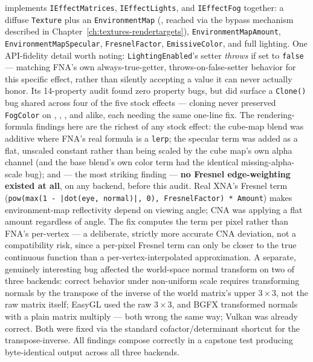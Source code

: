  implements \texttt{IEffectMatrices},
\texttt{IEffectLights}, and \texttt{IEffectFog} together: a diffuse \texttt{Texture} plus an
\texttt{EnvironmentMap} (, reached via the bypass mechanism described in
Chapter~\ref{ch:textures-rendertargets}), \texttt{EnvironmentMapAmount},
\texttt{EnvironmentMapSpecular}, \texttt{FresnelFactor}, \texttt{EmissiveColor}, and full
lighting. One API-fidelity detail worth noting: \texttt{LightingEnabled}'s setter
\emph{throws} if set to \texttt{false} --- matching FNA's own always-true-getter,
throws-on-false-setter behavior for this specific effect, rather than silently accepting a
value it can never actually honor. Its 14-property audit found zero property bugs, but did
surface a \texttt{Clone()} bug shared across four of the five stock effects --- cloning never
preserved \texttt{FogColor} on , ,
, and  alike, each needing the same
one-line fix. The rendering-formula findings here are the richest of any stock effect: the
cube-map blend was additive where FNA's real formula is a \texttt{lerp}; the specular term
was added as a flat, unscaled constant rather than being scaled by the cube map's own alpha
channel (and the base blend's own color term had the identical missing-alpha-scale bug); and
--- the most striking finding --- \textbf{no Fresnel edge-weighting existed at all}, on any
backend, before this audit. Real XNA's Fresnel term (\texttt{pow(max(1 - |dot(eye, normal)|,
0), FresnelFactor) * Amount}) makes environment-map reflectivity depend on viewing angle;
CNA was applying a flat amount regardless of angle. The fix computes the term per pixel
rather than FNA's per-vertex --- a deliberate, strictly more accurate CNA deviation, not a
compatibility risk, since a per-pixel Fresnel term can only be closer to the true continuous
function than a per-vertex-interpolated approximation. A separate, genuinely interesting bug
affected the world-space normal transform on two of three backends: correct behavior under
non-uniform scale requires transforming normals by the transpose of the inverse of the
world matrix's upper $3\times3$, not the raw matrix itself; EasyGL used the raw $3\times3$,
and BGFX transformed normals with a plain matrix multiply --- both wrong the same way; Vulkan
was already correct. Both were fixed via the standard cofactor/determinant shortcut for the
transpose-inverse. All findings compose correctly in a capstone test producing byte-identical
output across all three backends.

